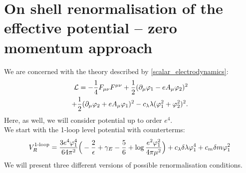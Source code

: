 \chapter{On shell renormalisation of the effective potential -- zero momentum approach}

We are concerned with the theory described by \ref{scalar_electrodynamics}:
\begin{align}
\mathcal{L} = -\frac{1}{4}F_{\mu\nu}F^{\mu\nu}+ 
\frac{1}{2}(\partial_\mu\varphi_1 - eA_\mu\varphi_2)^2\\
+\frac{1}{2}(\partial_\mu\varphi_2+eA_\mu\varphi_1)^2
-c_\lambda\lambda(\varphi_1^2+\varphi_2^2)^2. \notag
\end{align}
Here, as well, we will consider potential up to order $e^4$. \\
We start with the 1-loop level potential with counterterms:
\begin{align}
V_R^{\textrm{1-loop}} = \frac{3e^4\varphi_1^4}{64\pi^2}\Big(-\frac{2}{\epsilon}+\gamma_E-\frac{5}{6}+
\log{\frac{e^2\varphi_1^2}{4\pi\mu^2}}\Big) + c_\lambda\delta\lambda\varphi_1^4+c_m\delta m\varphi_1^2
\end{align}
We will present three different versions of possible renormalisation conditions. 
